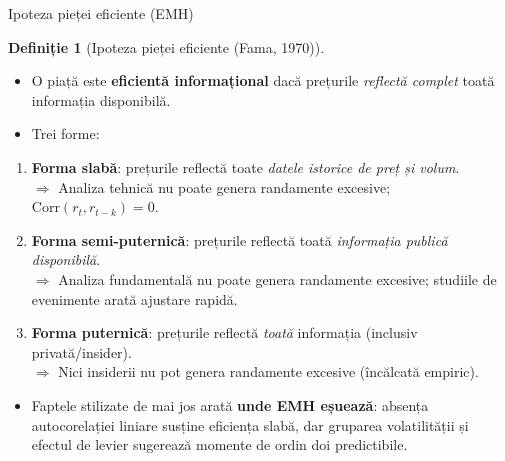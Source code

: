 \documentclass[9pt, aspectratio=169, t]{beamer}
\theoremstyle{definition}
\newtheorem{defn}{Definiție}
\newcommand{\Corr}{\text{Corr}}
\begin{document}
\begin{frame}{Ipoteza pieței eficiente (EMH)}
\begin{defn}[Ipoteza pieței eficiente (Fama, 1970)]
\begin{itemize}\setlength{\itemsep}{1pt}
    \item O piață este \textbf{eficientă informațional} dacă prețurile \textit{reflectă complet} toată informația disponibilă.
    \item Trei forme:
\end{itemize}
\end{defn}
\vspace{0.1cm}
\begin{enumerate}
    \item \textbf{Forma slabă}: prețurile reflectă toate \textit{datele istorice de preț și volum}.\\
    $\Rightarrow$ Analiza tehnică nu poate genera randamente excesive; $\Corr(r_t, r_{t-k}) = 0$.
    \item \textbf{Forma semi-puternică}: prețurile reflectă toată \textit{informația publică disponibilă}.\\
    $\Rightarrow$ Analiza fundamentală nu poate genera randamente excesive; studiile de evenimente arată ajustare rapidă.
    \item \textbf{Forma puternică}: prețurile reflectă \textit{toată} informația (inclusiv privată/insider).\\
    $\Rightarrow$ Nici insiderii nu pot genera randamente excesive (încălcată empiric).
\end{enumerate}
\vspace{0.1cm}
\begin{itemize}
    \item Faptele stilizate de mai jos arată \textbf{unde EMH eșuează}: absența autocorelației liniare susține eficiența slabă, dar gruparea volatilității și efectul de levier sugerează momente de ordin doi predictibile.
\end{itemize}
\end{frame}
\end{document}
